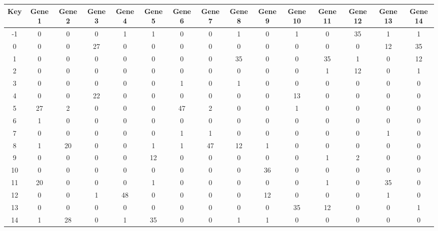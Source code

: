 \begin{tabular}{|c|c|c|c|c|c|c|c|c|c|c|c|c|c|c|}
\hline
Key & Gene 1 & Gene 2 & Gene 3 & Gene 4 & Gene 5 & Gene 6 & Gene 7 & Gene 8 & Gene 9 & Gene 10 & Gene 11 & Gene 12 & Gene 13 & Gene 14 \\
\hline
-1 & 0 & 0 & 0 & 1 & 1 & 0 & 0 & 1 & 0 & 1 & 0 & 35 & 1 & 1 \\
0 & 0 & 0 & 27 & 0 & 0 & 0 & 0 & 0 & 0 & 0 & 0 & 0 & 12 & 35 \\
1 & 0 & 0 & 0 & 0 & 0 & 0 & 0 & 35 & 0 & 0 & 35 & 1 & 0 & 12 \\
2 & 0 & 0 & 0 & 0 & 0 & 0 & 0 & 0 & 0 & 0 & 1 & 12 & 0 & 1 \\
3 & 0 & 0 & 0 & 0 & 0 & 1 & 0 & 1 & 0 & 0 & 0 & 0 & 0 & 0 \\
4 & 0 & 0 & 22 & 0 & 0 & 0 & 0 & 0 & 0 & 13 & 0 & 0 & 0 & 0 \\
5 & 27 & 2 & 0 & 0 & 0 & 47 & 2 & 0 & 0 & 1 & 0 & 0 & 0 & 0 \\
6 & 1 & 0 & 0 & 0 & 0 & 0 & 0 & 0 & 0 & 0 & 0 & 0 & 0 & 0 \\
7 & 0 & 0 & 0 & 0 & 0 & 1 & 1 & 0 & 0 & 0 & 0 & 0 & 1 & 0 \\
8 & 1 & 20 & 0 & 0 & 1 & 1 & 47 & 12 & 1 & 0 & 0 & 0 & 0 & 0 \\
9 & 0 & 0 & 0 & 0 & 12 & 0 & 0 & 0 & 0 & 0 & 1 & 2 & 0 & 0 \\
10 & 0 & 0 & 0 & 0 & 0 & 0 & 0 & 0 & 36 & 0 & 0 & 0 & 0 & 0 \\
11 & 20 & 0 & 0 & 0 & 1 & 0 & 0 & 0 & 0 & 0 & 1 & 0 & 35 & 0 \\
12 & 0 & 0 & 1 & 48 & 0 & 0 & 0 & 0 & 12 & 0 & 0 & 0 & 1 & 0 \\
13 & 0 & 0 & 0 & 0 & 0 & 0 & 0 & 0 & 0 & 35 & 12 & 0 & 0 & 1 \\
14 & 1 & 28 & 0 & 1 & 35 & 0 & 0 & 1 & 1 & 0 & 0 & 0 & 0 & 0 \\
\hline
\end{tabular}